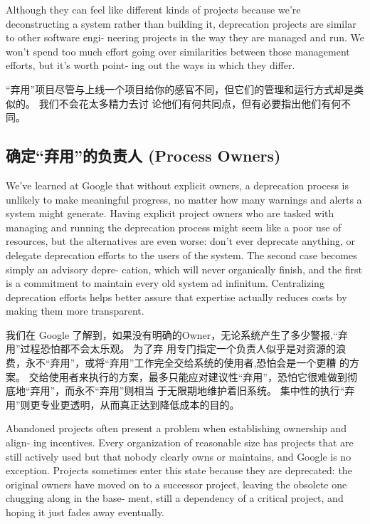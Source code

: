 \documentclass[10pt,a4paper,UTF8]{ctexart}
\begin{document}
Although they can feel like different kinds of projects because we’re deconstructing a system rather
than building it, deprecation projects are similar to other software engi‐ neering projects in the
way they are managed and run. We won’t spend too much effort going over similarities between those
management efforts, but it’s worth point‐ ing out the ways in which they differ.

“弃用”项目尽管与上线一个项目给你的感官不同，但它们的管理和运行方式却是类似的。 我们不会花太多精力去讨
论他们有何共同点，但有必要指出他们有何不同。

\subsection{确定“弃用”的负责人 (Process Owners)}
\label{sec:orgb992291}

We’ve learned at Google that without explicit owners, a deprecation process is unlikely to make
meaningful progress, no matter how many warnings and alerts a system might generate. Having explicit
project owners who are tasked with managing and running the deprecation process might seem like a
poor use of resources, but the alternatives are even worse: don’t ever deprecate anything, or
delegate deprecation efforts to the users of the system. The second case becomes simply an advisory
depre‐ cation, which will never organically finish, and the first is a commitment to maintain every
old system ad infinitum. Centralizing deprecation efforts helps better assure that expertise
actually reduces costs by making them more transparent.

我们在 Google 了解到，如果没有明确的Owner，无论系统产生了多少警报,“弃用”过程恐怕都不会太乐观。 为了弃
用专门指定一个负责人似乎是对资源的浪费，永不“弃用”，或将“弃用”工作完全交给系统的使用者,恐怕会是一个更糟
的方案。 交给使用者来执行的方案，最多只能应对建议性“弃用”，恐怕它很难做到彻底地“弃用”，而永不“弃用”则相当
于无限期地维护着旧系统。 集中性的执行“弃用”则更专业更透明，从而真正达到降低成本的目的。

Abandoned projects often present a problem when establishing ownership and align‐ ing incentives.
Every organization of reasonable size has projects that are still actively used but that nobody
clearly owns or maintains, and Google is no exception. Projects sometimes enter this state because
they are deprecated: the original owners have moved on to a successor project, leaving the obsolete
one chugging along in the base‐ ment, still a dependency of a critical project, and hoping it just
fades away eventually.
\end{document}
